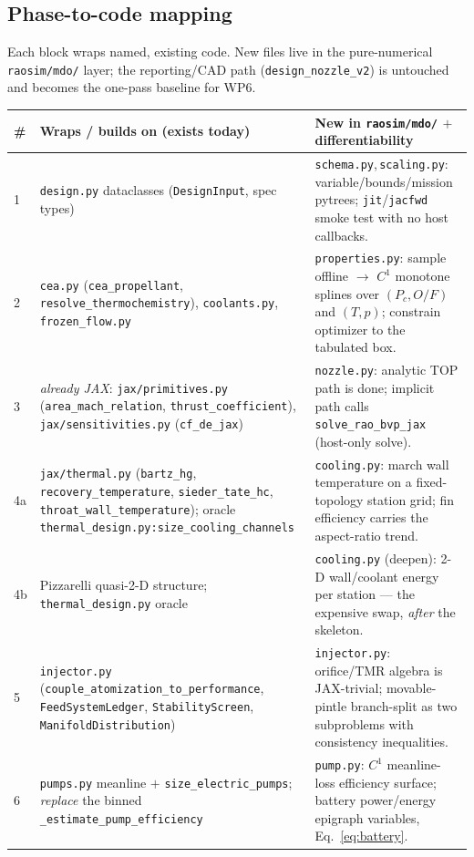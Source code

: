 \documentclass[11pt]{article}
\newcommand{\cmd}[1]{\nolinkurl{#1}}
\begin{document}
\subsection{Phase-to-code mapping}
Each block wraps named, existing code. New files live in the pure-numerical
\cmd{raosim/mdo/} layer; the reporting/CAD path (\cmd{design\_nozzle\_v2}) is
untouched and becomes the one-pass baseline for WP6.

{\footnotesize
\begin{longtable}{@{}p{0.55cm}p{6.7cm}p{7.7cm}@{}}
\toprule
\textbf{\#} & \textbf{Wraps / builds on (exists today)} & \textbf{New in \cmd{raosim/mdo/} $+$ differentiability} \\
\midrule
\endhead
1 & \cmd{design.py} dataclasses (\cmd{DesignInput}, spec types) & \cmd{schema.py},\,\cmd{scaling.py}: variable/bounds/mission pytrees; \cmd{jit}/\cmd{jacfwd} smoke test with no host callbacks. \\
2 & \cmd{cea.py} (\cmd{cea\_propellant}, \cmd{resolve\_thermochemistry}), \cmd{coolants.py}, \cmd{frozen\_flow.py} & \cmd{properties.py}: sample offline $\to$ $C^1$ monotone splines over $(P_c,O/F)$ and $(T,p)$; constrain optimizer to the tabulated box. \\
3 & \emph{already JAX}: \cmd{jax/primitives.py} (\cmd{area\_mach\_relation}, \cmd{thrust\_coefficient}), \cmd{jax/sensitivities.py} (\cmd{cf\_de\_jax}) & \cmd{nozzle.py}: analytic TOP path is done; implicit path calls \cmd{solve\_rao\_bvp\_jax} (host-only solve). \\
4a & \cmd{jax/thermal.py} (\cmd{bartz\_hg}, \cmd{recovery\_temperature}, \cmd{sieder\_tate\_hc}, \cmd{throat\_wall\_temperature}); oracle \cmd{thermal\_design.py:size\_cooling\_channels} & \cmd{cooling.py}: march wall temperature on a fixed-topology station grid; fin efficiency carries the aspect-ratio trend. \\
4b & Pizzarelli quasi-2-D structure; \cmd{thermal\_design.py} oracle & \cmd{cooling.py} (deepen): 2-D wall/coolant energy per station --- the expensive swap, \emph{after} the skeleton. \\
5 & \cmd{injector.py} (\cmd{couple\_atomization\_to\_performance}, \cmd{FeedSystemLedger}, \cmd{StabilityScreen}, \cmd{ManifoldDistribution}) & \cmd{injector.py}: orifice/TMR algebra is JAX-trivial; movable-pintle branch-split as two subproblems with consistency inequalities. \\
6 & \cmd{pumps.py} meanline $+$ \cmd{size\_electric\_pumps}; \emph{replace} the binned \cmd{\_estimate\_pump\_efficiency} & \cmd{pump.py}: $C^1$ meanline-loss efficiency surface; battery power/energy epigraph variables, Eq.~\eqref{eq:battery}. \\

\end{longtable}}
\end{document}

